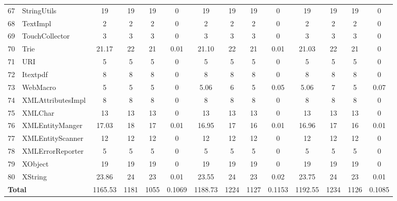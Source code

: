 \documentclass[conference]{IEEEtran}
\begin{document}
\begin{table} [h!]
{\begin{tabular}{c l c c c c c c c c c c c c}
 67						& StringUtils					&19 	&	19	&	19	& 		0					& 19		& 19 		& 19		& 		0			& 19			& 19			& 19			&	0\\      
 68						& TextImpl					& 2 	&	2	&	2	& 		0					& 2		&  2		& 2		& 		0			& 2			& 2			& 2			&	0\\      
 69						& TouchCollector				& 3	&	3	&	3	& 		0					& 3		&  3		& 3		& 		0			& 3			& 3			& 3			&	0\\      
 70						& Trie						& 21.17&	22	&	21	& 		0.01					& 21.10	&  22		& 21		& 		0.01			& 21.03		& 22			& 21			&	0\\      
 71						& URI						& 5 	&	5	&	5	& 		0					& 5		&  5		& 5		& 		0			& 5			& 5			& 5			&	0\\      
 72						& Itextpdf						& 8	&	8	&	8	& 		0					& 8		&  8		& 8		& 		0			& 8			& 8			& 8			&	0\\      
 73						& WebMacro					& 5	&	5	&	5	& 		0					& 5.06	&  6		& 5		& 		0.05			& 5.06		& 7			& 5			&	0.07\\      
 74						& XMLAttributesImpl				& 8	&	8	&	8	& 		0					& 8		&  8		& 8		& 		0			& 8			& 8			& 8			&	0\\      
 75						& XMLChar					& 13	&	13	&	13	& 		0					& 13		&  13		& 13		& 		0			& 13			& 13			& 13			&	0\\      
 76						& XMLEntityManger				& 17.03&	18	&	17	& 		0.01					& 16.95	&  17		& 16		& 		0.01			& 16.96		& 17			& 16			&	0.01\\      
 77						& XMLEntityScanner				& 12	&	12	&	12	& 		0					& 12		&  12		& 12		& 		0			& 12			& 12			& 12			&	0\\      
 78						& XMLErrorReporter				& 5	&	5	&	5	& 		0					& 5		&  5		& 5		& 		0			& 5			& 5			& 5			&	0\\      
 79						& XObject						& 19	&	19	&	19	& 		0					& 19		&  19		& 19		& 		0			& 19			& 19			& 19			&	0\\      
 80						& XString						& 23.86&	24	&	23	& 		0.01					& 23.55	&  24		& 23		& 		0.02			& 23.75		& 24			& 23			&	0.01\\      
    						\multicolumn{2}{l}{\textbf{Total}}						&1165.53	& 1181	&    1055	&		0.1069					& 1188.73		&	1224	&	1127	&	0.1153			& 1192.55		& 1234		& 1126		& 	0.1085\\
     \end{tabular}
    \label{table:Results}
     }
     \end{table}
\end{document}
